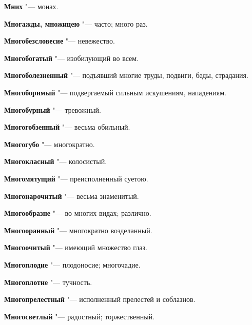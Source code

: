 \begin{mymulticols}{2}
\noindent\textbf{Мних} "--- монах. 




\noindent\textbf{Многажды, множицею} "--- часто; много раз. 




\noindent\textbf{Многобезсловесие} "--- невежество. 




\noindent\textbf{Многобогатый} "--- изобилующий во всем. 




\noindent\textbf{Многоболезненный} "--- подъявший многие труды, подвиги, беды, страдания. 




\noindent\textbf{Многоборимый} "--- подвергаемый сильным искушениям, нападениям. 




\noindent\textbf{Многобурный} "--- тревожный. 




\noindent\textbf{Многогобзенный} "--- весьма обильный. 




\noindent\textbf{Многогубо} "--- многократно. 




\noindent\textbf{Многокласный} "--- колосистый. 




\noindent\textbf{Многомятущий} "--- преисполненный суетою. 




\noindent\textbf{Многонарочитый} "--- весьма знаменитый. 




\noindent\textbf{Многообразне} "--- во многих видах; различно. 




\noindent\textbf{Многооранный} "--- многократно возделанный. 




\noindent\textbf{Многоочитый} "--- имеющий множество глаз. 




\noindent\textbf{Многоплодие} "--- плодоносие; многочадие. 




\noindent\textbf{Многоплотие} "--- тучность. 




\noindent\textbf{Многопрелестный} "--- исполненный прелестей и соблазнов. 




\noindent\textbf{Многосветлый} "--- радостный; торжественный. 





\end{mymulticols}
